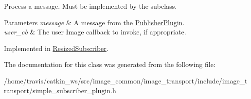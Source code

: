 Process a message. Must be implemented by the subclass. 


\begin{DoxyParams}{Parameters}
{\em message} & A message from the \hyperlink{classimage__transport_1_1_publisher_plugin}{Publisher\-Plugin}. \\
\hline
{\em user\-\_\-cb} & The user Image callback to invoke, if appropriate. \\
\hline
\end{DoxyParams}


Implemented in \hyperlink{class_resized_subscriber_ad0a3debf9a2135bbbae6145cebb958e8}{Resized\-Subscriber}.



The documentation for this class was generated from the following file\-:\begin{DoxyCompactItemize}
\item 
/home/travis/catkin\-\_\-ws/src/image\-\_\-common/image\-\_\-transport/include/image\-\_\-transport/simple\-\_\-subscriber\-\_\-plugin.\-h\end{DoxyCompactItemize}
